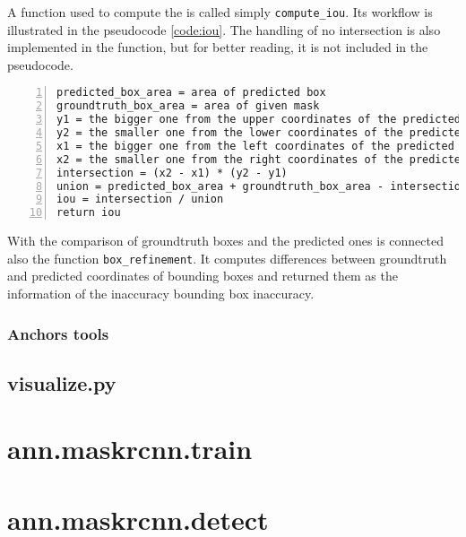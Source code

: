 A function used to compute the  is called simply \verb|compute_iou|. Its workflow is illustrated in the pseudocode \ref{code:iou}. The handling of no intersection is also implemented in the function, but for better reading, it is not included in the pseudocode.

{\scriptsize
\begin{lstlisting}[style=python, caption={compute\_iou}, captionpos=b, label=code:iou, deletekeywords={from, and},
backgroundcolor = \color{light-gray}, numbers=left, breaklines=true]
predicted_box_area = area of predicted box
groundtruth_box_area = area of given mask
y1 = the bigger one from the upper coordinates of the predicted and groundtruth bboxes
y2 = the smaller one from the lower coordinates of the predicted and groundtruth bboxes
x1 = the bigger one from the left coordinates of the predicted and groundtruth bboxes
x2 = the smaller one from the right coordinates of the predicted and groundtruth bboxes
intersection = (x2 - x1) * (y2 - y1)
union = predicted_box_area + groundtruth_box_area - intersection
iou = intersection / union
return iou
\end{lstlisting}}

With the comparison of groundtruth boxes and the predicted ones is connected also the function \verb|box_refinement|. It computes differences between groundtruth and predicted coordinates of bounding boxes and returned them as the information of the inaccuracy bounding box inaccuracy.


\subsubsection{Anchors tools}
\label{anchors-func}



\subsection{visualize.py}
\label{visualize}

\section{ann.maskrcnn.train}
\label{train-module}

\section{ann.maskrcnn.detect}
\label{detect-module}
